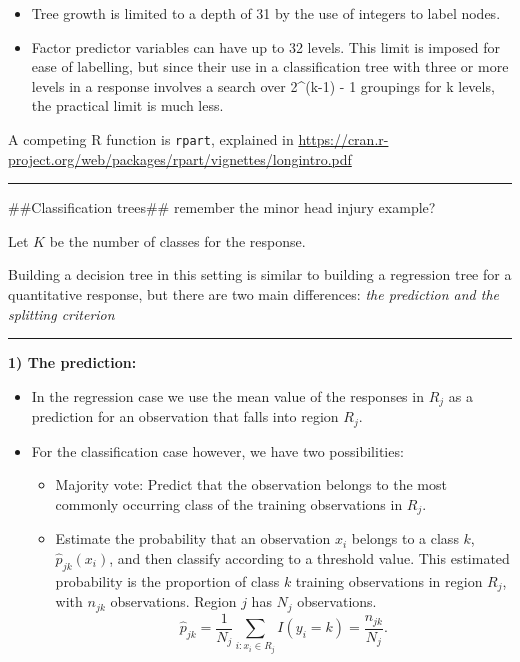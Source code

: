 \documentclass[]{article}
\providecommand{\tightlist}{%
  \setlength{\itemsep}{0pt}\setlength{\parskip}{0pt}}
\begin{document}
\begin{itemize}
\tightlist
\item
  Tree growth is limited to a depth of 31 by the use of integers to
  label nodes.
\item
  Factor predictor variables can have up to 32 levels. This limit is
  imposed for ease of labelling, but since their use in a classification
  tree with three or more levels in a response involves a search over
  2\^{}(k-1) - 1 groupings for k levels, the practical limit is much
  less.
\end{itemize}

A competing R function is \texttt{rpart}, explained in
\url{https://cran.r-project.org/web/packages/rpart/vignettes/longintro.pdf}

\begin{center}\rule{0.5\linewidth}{\linethickness}\end{center}

\#\#Classification trees\#\# remember the minor head injury example?

Let \(K\) be the number of classes for the response.

Building a decision tree in this setting is similar to building a
regression tree for a quantitative response, but there are two main
differences: \emph{the prediction and the splitting criterion}

\begin{center}\rule{0.5\linewidth}{\linethickness}\end{center}

\textbf{1) The prediction:}

\begin{itemize}
\tightlist
\item
  In the regression case we use the mean value of the responses in
  \(R_j\) as a prediction for an observation that falls into region
  \(R_j\).
\item
  For the classification case however, we have two possibilities:

  \begin{itemize}
  \tightlist
  \item
    Majority vote: Predict that the observation belongs to the most
    commonly occurring class of the training observations in \(R_j\).\\
  \item
    Estimate the probability that an observation \(x_i\) belongs to a
    class \(k\), \(\hat{p}_{jk}(x_i)\), and then classify according to a
    threshold value. This estimated probability is the proportion of
    class \(k\) training observations in region \(R_j\), with \(n_{jk}\)
    observations. Region \(j\) has \(N_j\) observations.
    \[\hat{p}_{jk} = \frac{1}{N_j} \sum_{i:x_i \in R_j} I(y_i = k)=\frac{n_{jk}}{N_j}.\]
  \end{itemize}
\end{itemize}
\end{document}
